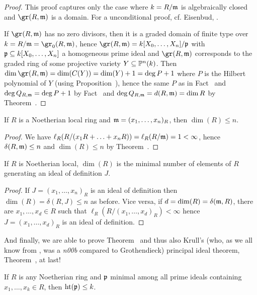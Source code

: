 \documentclass[a4paper,parskip=half,numbers=enddot, DIV=12]{scrreprt}
\begin{document}
\begin{proof}
    This proof captures only the case where $k=R/\mathfrak{m}$ is algebraically closed and $\gr(R,\mm)$ is a domain. For a unconditional proof, cf. Eisenbud, \cite[Corollary~12.5]{eisenbudCommAlg}.
    
    If $\gr(R,\mm)$ has no zero divisors, then it is a graded domain of finite type over $k=R/\mm=\gr_0(R,\mm)$, hence $\gr(R,\mm) = k[X_0,\ldots, X_n]/\pp$ with $\mathfrak{p}\subseteq k[X_0,\ldots,X_n]$ a homogeneous prime ideal and $\gr(R,\mm)$ corresponds to the graded ring of some projective variety $Y\subseteq \mathbb{P}^{n}(k)$. Then $\dim\gr(R,\mm) = \dim(C(Y)) = \dim(Y) +1 = \deg P+1 $ where $P$ is the Hilbert polynomial of $Y$ (using Proposition~), hence the same $P$ as in Fact~ and $\deg Q_{R,\mathfrak{m}} = \deg P+1$ by Fact~ and $\deg Q_{R,\mathfrak{m}}=d(R,\mathfrak{m})=\dim R$ by Theorem~.
\end{proof}
\begin{cor}
    If $R$ is a Noetherian local ring and $\mathfrak{m} =( x_1,\ldots, x_n)_R$, then $\dim(R) \leq n$.
\end{cor}
\begin{proof}
    We have $\ell_R(R/(x_1R+\ldots +x_nR) ) = \ell_R(R/\mathfrak{m}) = 1< \infty$, hence $\delta(R,\mathfrak{m}) \leq n$ and $\dim(R) \leq n$ by Theorem~.
\end{proof}
\begin{cor}
    If $R$ is Noetherian local, $\dim(R)$ is the minimal number of elements of $R$ generating an ideal of definition $J$.
\end{cor}
\begin{proof}
    If $J= (x_1,\ldots,x_n)_R$ is an ideal of definition then $\dim(R) = \delta(R,J) \leq n$ as before. Vice versa, if $d=\dim(R) = \delta(\mathfrak{m},R)$, there are $x_1,\ldots, x_d\in R$ such that $\ell_R(R/(x_1,\ldots, x_d)_R)<\infty$ hence $J= (x_1,\ldots, x_d)_R$ is an ideal of definition.
\end{proof}
And finally, we are able to prove Theorem~ and thus also Krull's (who, as we all know from \cite{alg1}, was a \emph{n00b} compared to Grothendieck) principal ideal theorem, Theorem~, at last!
\begin{cor}
    If $R$ is any Noetherian ring and $\mathfrak{p}$ minimal among all prime ideals containing $x_1,\ldots, x_k\in R$, then $\operatorname{ht}(\mathfrak{p}) \leq k$.
\end{cor}
\end{document}
